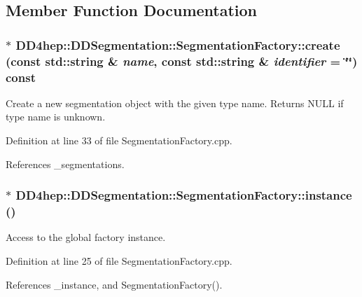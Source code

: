 \subsection{Member Function Documentation}
\hypertarget{class_d_d4hep_1_1_d_d_segmentation_1_1_segmentation_factory_ad7f56347bdd4fd2e92df071166f29a40}{
\subsubsection[{create}]{ $\ast$ DD4hep::DDSegmentation::SegmentationFactory::create (const std::string \& {\em name}, \/  const std::string \& {\em identifier} = {\ttfamily \char`\"{}\char`\"{}}) const}}
\label{class_d_d4hep_1_1_d_d_segmentation_1_1_segmentation_factory_ad7f56347bdd4fd2e92df071166f29a40}


Create a new segmentation object with the given type name. Returns NULL if type name is unknown. 

Definition at line 33 of file SegmentationFactory.cpp.

References \_\-segmentations.\hypertarget{class_d_d4hep_1_1_d_d_segmentation_1_1_segmentation_factory_a92954fdbd0bc642e5b594ef7f4ee3cfc}{
\subsubsection[{instance}]{ $\ast$ DD4hep::DDSegmentation::SegmentationFactory::instance ()}}
\label{class_d_d4hep_1_1_d_d_segmentation_1_1_segmentation_factory_a92954fdbd0bc642e5b594ef7f4ee3cfc}


Access to the global factory instance. 

Definition at line 25 of file SegmentationFactory.cpp.

References \_\-instance, and SegmentationFactory().

